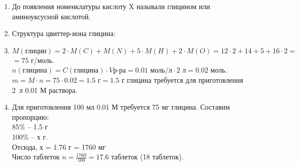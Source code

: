 \solutionSection

\begin{enumerate}
    \item {}

    До появления номенклатуры кислоту X называли глицином или аминоуксусной кислотой.
    \item Структура цвиттер-иона глицина:\\
    \item $M (\text{глицин}) = 2\cdot M(C) + M(N) + 5\cdot M(H) + 2\cdot M(O) = 12\cdot 2 +14 + 5 +16\cdot2 =$ \linebreak $=75$ г/моль.\\
    $n (\text{глицина}) = C(\text{глицина})\cdot V\text{р-ра} = 0.01\text{ моль/л}\cdot2\text{ л} = 0.02$ моль.\\
    $m = M\cdot n = 75\cdot0.02 = 1.5$ г$ = 1.5$ г глицина требуется для приготовления 2~л 0.01 М раствора.
    \item Для приготовления 100 мл 0.01 М требуется 75 мг глицина. Составим пропорцию:\\
    85\% – 1.5 г\\
    100\% – х г.\\
    Отсюда, х = 1.76 г = 1760 мг \\
    Число таблеток $n = \frac{1760}{100} = 17.6$ таблеток (18 таблеток).
    \end{enumerate}